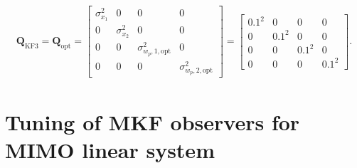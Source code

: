 \begin{equation} \label{eq:sim-sys-sim3-KF3-Q}
	\begin{aligned}
		\mathbf{Q}_{\text{KF3}}=\mathbf{Q}_{\text{opt}}=\begin{bmatrix}
			\sigma_{x_1}^2 & 0 & 0 & 0 \\
			0 & \sigma_{x_2}^2 & 0 & 0 \\
			0 & 0 & \sigma_{w_p,1,\text{opt}}^2 & 0 \\
			0 & 0 & 0 & \sigma_{w_p,2,\text{opt}}^2
		\end{bmatrix}=\begin{bmatrix}
			0.1^2 & 0 & 0 & 0 \\
			0 & 0.1^2 & 0 & 0 \\
			0 & 0 & 0.1^2 & 0 \\
			0 & 0 & 0 & 0.1^2
		\end{bmatrix}.
	\end{aligned}
\end{equation}

\section{Tuning of MKF observers for MIMO linear system} \label{section:annex-sim-2-MKF-tuning}


